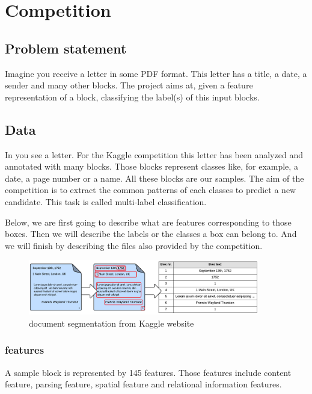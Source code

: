




\section{Competition}

	\subsection{Problem statement}
	Imagine you receive a letter in some PDF format. This letter has a title, a date, a sender and many other blocks. The project aims at, given a feature representation of a block, classifying the label(s) of this input blocks.




	\subsection{Data}
	\label{sec:dataset}

		In  you see a letter. For the Kaggle competition this letter has been analyzed and annotated with many blocks. Those blocks represent classes like, for example, a date, a page number or a name. All these blocks are our samples. The aim of the competition is to extract the common patterns of each classes to predict a new candidate. This task is called multi-label classification. 

		Below, we are first going to describe what are features corresponding to those boxes. Then we will describe the labels or the classes a box can belong to. And we will finish by describing the files also provided by the competition.		

		\begin{figure}[h]
			\begin{center}
				\includegraphics[width=0.9\textwidth]{FeatureExtraction1.png}
			\end{center}
			\caption{document segmentation from Kaggle website 
			\label{fig:FeatureExtraction1}}
		\end{figure}

		\subsubsection{features}
			A sample block is represented by 145 features. Those features include content feature, parsing feature, spatial feature and relational information features.

